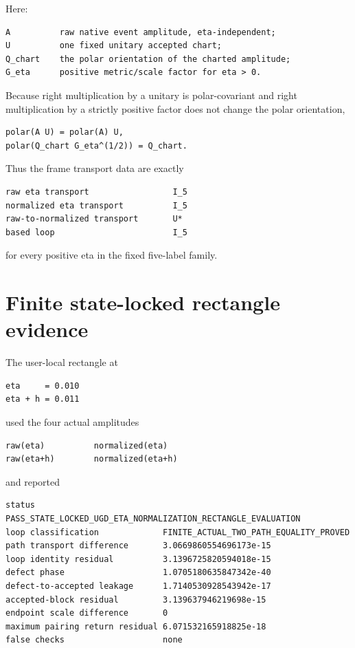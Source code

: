 Here:

\begin{verbatim}
A          raw native event amplitude, eta-independent;
U          one fixed unitary accepted chart;
Q_chart    the polar orientation of the charted amplitude;
G_eta      positive metric/scale factor for eta > 0.
\end{verbatim}

Because right multiplication by a unitary is polar-covariant and right multiplication by a strictly positive factor does not change the polar orientation,

\begin{verbatim}
polar(A U) = polar(A) U,
polar(Q_chart G_eta^(1/2)) = Q_chart.
\end{verbatim}

Thus the frame transport data are exactly

\begin{verbatim}
raw eta transport                 I_5
normalized eta transport          I_5
raw-to-normalized transport       U*
based loop                        I_5
\end{verbatim}

for every positive eta in the fixed five-label family.

\hypertarget{finite-state-locked-rectangle-evidence}{%
\section{Finite state-locked rectangle evidence}\label{finite-state-locked-rectangle-evidence}}

The user-local rectangle at

\begin{verbatim}
eta     = 0.010
eta + h = 0.011
\end{verbatim}

used the four actual amplitudes

\begin{verbatim}
raw(eta)          normalized(eta)
raw(eta+h)        normalized(eta+h)
\end{verbatim}

and reported

\begin{verbatim}
status                          PASS_STATE_LOCKED_UGD_ETA_NORMALIZATION_RECTANGLE_EVALUATION
loop classification             FINITE_ACTUAL_TWO_PATH_EQUALITY_PROVED
path transport difference       3.0669860554696173e-15
loop identity residual          3.1396725820594018e-15
defect phase                    1.0705180635847342e-40
defect-to-accepted leakage      1.7140530928543942e-17
accepted-block residual         3.139637946219698e-15
endpoint scale difference       0
maximum pairing return residual 6.071532165918825e-18
false checks                    none
\end{verbatim}

